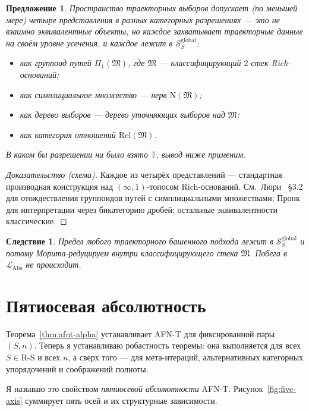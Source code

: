 \documentclass[11pt]{article}
\theoremstyle{plain}
\newtheorem{proposition}[theorem]{Предложение}
\newtheorem{corollary}[theorem]{Следствие}
\theoremstyle{definition}
\newcommand{\RS}{\mathrm{R\text{-}S}}
\newcommand{\cS}{\mathcal{S}}
\newcommand{\fM}{\mathfrak{M}}
\newcommand{\LAbs}{\mathcal{L}_{\mathrm{Abs}}}
\begin{document}
\begin{proposition}\label{prop:trajectory-space}
Пространство траекторных выборов допускает (по меньшей мере) четыре представления в разных категорных разрешениях --- это \emph{не} взаимно эквивалентные объекты, но каждое захватывает траекторные данные на своём уровне усечения, и \emph{каждое} лежит в $\cS_S^{\mathrm{global}}$:
\begin{itemize}
\item как группоид путей $\Pi_1(\fM)$, где $\fM$ — классифицирующий $2$-стек Rich-оснований;
\item как симплициальное множество — нерв $\mathrm{N}(\fM)$;
\item как дерево выборов — дерево уточняющих выборов над $\fM$;
\item как категория отношений $\mathrm{Rel}(\fM)$.
\end{itemize}
В каком бы разрешении ни было взято $\mathbb{T}$, вывод ниже применим.
\end{proposition}

\begin{proof}[Доказательство (схема)]
Каждое из четырёх представлений — стандартная производная конструкция над $(\infty, 1)$-топосом Rich-оснований. См.\ Люри~\cite{LurieHTT} \S 3.2 для отождествления группоидов путей с симплициальными множествами; Пронк~\cite{Pronk1996} для интерпретации через бикатегорию дробей; остальные эквивалентности классические.
\end{proof}

\begin{corollary}
Предел любого траекторного башенного подхода лежит в $\cS_S^{\mathrm{global}}$ и потому Морита-редуцируем внутри классифицирующего стека $\fM$. Побега в $\LAbs$ не происходит.
\end{corollary}

\section{Пятиосевая абсолютность}\label{sec:five-axis}

Теорема~\ref{thm:afnt-alpha} устанавливает AFN-T для фиксированной пары $(S, n)$. Теперь я устанавливаю робастность теоремы: она выполняется для всех $S \in \RS$ и всех $n$, а сверх того — для мета-итераций, альтернативных категорных упорядочений и соображений полноты.

Я называю это свойством \emph{пятиосевой абсолютности} AFN-T. Рисунок~\ref{fig:five-axis} суммирует пять осей и их структурные зависимости.
\end{document}
